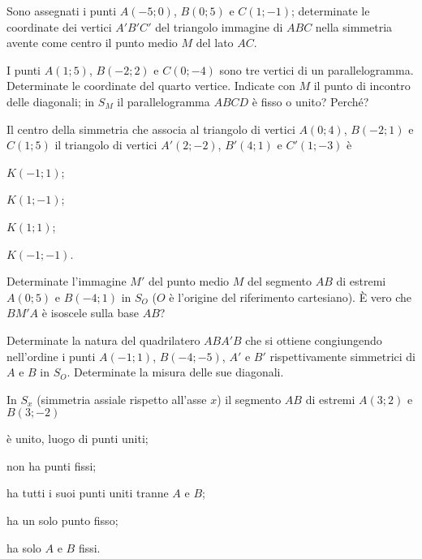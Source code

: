 \begin{esercizio}
  \label{ese:8.9}
  Sono assegnati i punti \(A(-5;0)\), \(B(0;5)\) e \(C(1;-1)\); determinate 
  le coordinate dei vertici \(A'B'C'\) del triangolo immagine di \(ABC\) 
  nella simmetria avente come centro il punto medio \(M\) del lato \(AC\).
\end{esercizio}

\begin{esercizio}
  \label{ese:8.10}
  I punti \(A(1;5)\), \(B(-2;2)\) e \(C(0;-4)\) sono tre vertici di un 
  parallelogramma. Determinate le coordinate del quarto vertice. 
  Indicate con \(M\) il punto di incontro delle diagonali; in \(S_M\) il 
  parallelogramma \(ABCD\) è fisso o unito? Perché?
\end{esercizio}

\begin{esercizio}
  \label{ese:8.13}
  Il centro della simmetria che associa al triangolo di vertici 
  \(A(0;4)\), \(B(-2;1)\) e \(C(1;5)\) il triangolo di vertici \(A'(2;-2)\), 
  \(B'(4;1)\) e \(C'(1;-3)\) è
  \begin{multicols}{2}
    \begin{enumeratea}
      \item \(K(-1;1)\);
      \item \(K(1;-1)\);
      \item \(K(1;1)\);
      \item \(K(-1;-1)\).
    \end{enumeratea}
  \end{multicols}
\end{esercizio}

\begin{esercizio}
  \label{ese:8.14}
  Determinate l'immagine \(M'\) del punto medio \(M\) del segmento \(AB\) di 
  estremi \(A(0;5)\) e \(B(-4;1)\) in \(S_O\) (\(O\) è l'origine del 
  riferimento cartesiano). \`E vero che \(BM'A\) è isoscele sulla base 
  \(AB\)?
\end{esercizio}

\begin{esercizio}
  \label{ese:8.15}
  Determinate la natura del quadrilatero \(ABA'B\) che si ottiene 
  congiungendo nell'ordine i punti \(A(-1;1)\), \(B(-4;-5)\), \(A'\) e \(B'\) 
  rispettivamente simmetrici di \(A\) e \(B\) in \(S_O\). Determinate la 
  misura delle sue diagonali.
\end{esercizio}

\begin{esercizio}
  \label{ese:8.27}
  In \(S_x\) (simmetria assiale rispetto all'asse \(x\)) il segmento \(AB\) 
  di estremi \(A(3;2)\) e \(B(3;-2)\)
  \begin{enumeratea}
    \item è unito, luogo di punti uniti;
    \item non ha punti fissi;
    \item ha tutti i suoi punti uniti tranne \(A\) e \(B\);
    \item ha un solo punto fisso;
    \item ha solo \(A\) e \(B\) fissi.
  \end{enumeratea}
\end{esercizio}


